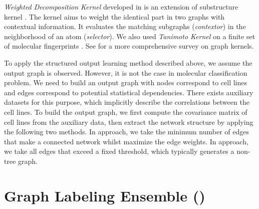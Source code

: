 {%
\textit{Weighted Decomposition Kernel} developed in \citep{Menchetti05weighted,Ceroni08classification} is an extension of substructure kernel \citep{Haussler99convolution}.
The kernel aims to weight the identical part in two graphs with contextual information.
It evaluates the matching subgraphs (\textit{contextor}) in the neighborhood of an atom (\textit{selector}).
We also used \textit{Tanimoto Kernel} \citep{Ralaivola05graph} on a finite set of molecular fingerprints \citep{Wang09pubchem}.
See \citep{Vishwanathan10graph} for a more comprehensive survey on graph kernels.

To apply the structured output learning method described above, we assume the output graph is observed.
However, it is not the case in molecular classification problem.
We need to build an output graph with nodes correspond to cell lines and edges correspond to potential statistical dependencies.
There exists auxiliary datasets \citep{Shoemaker06the} for this purpose, which implicitly describe the correlations between the cell lines.
To build the output graph, we first compute the covariance matrix of cell lines from the auxiliary data, then extract the network structure by applying the following two methods.
In  approach, we take the minimum number of edges that make a connected network whilst maximize the edge weights.
In  approach, we take all edges that exceed a fixed threshold, which typically generates a non-tree graph.



%
%
\section{Graph Labeling Ensemble (\mve)}\label{sc_su11}

}
